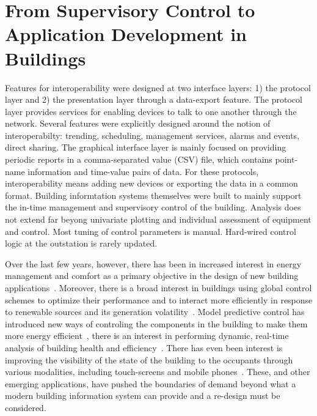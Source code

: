 \section{From Supervisory Control to Application Development in Buildings}

Features for interoperability were designed at two interface layers: 1) the protocol layer and 2) the presentation layer through a
data-export feature.  The protocol layer provides services for enabling devices to talk to one another through the network.  
Several features were explicitly designed around
the notion of interoperabilty: trending, scheduling, management services, alarms and events, direct sharing.  The graphical
interface layer is mainly focused on providing periodic reports in a comma-separated value (CSV) file, which
contains point-name information and time-value pairs of data.
For these protocols, interoperability means adding new devices or exporting the data in a common format.
Building informtation systems themselves
were built to mainly support the in-time management and supervisory control of the building.  Analysis does not 
extend far beyong univariate plotting and individual assessment of equipment and control.  Most tuning of control parameters is 
manual.  Hard-wired control logic at the outstation is rarely updated.


Over the last few years, however, there has been in increased interest in energy management and comfort as a primary objective 
in the design of new building applications~\cite{6146507,Yu1956572,Mamidi2343582}.  Moreover, there is a broad interest in buildings
using global control schemes to optimize their performance and to interact more efficiently in response to renewable sources and its  
generation volatility~\cite{Taneja2223873,5985456,Lu2009}.  Model predictive control has introduced new ways of controling the components in the building
to make them more energy efficient~\cite{mpc}, there is an interest in performing dynamic, real-time analysis of building health
and efficiency~\cite{dynamicLeed}.  There has even been interest is improving the visibility of the state of the building to the 
occupants through various modalities, including touch-screens and mobile phones~\cite{andrew_lighting, Hsu1878444, Ortiz2422540}.  
These, and other emerging applications,
have pushed the boundaries of demand beyond what a modern building information system can provide and a re-design must be considered.